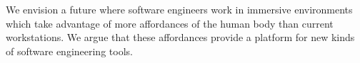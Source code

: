 \documentclass[conference]{IEEEtran}
\begin{document}
We envision a future where software engineers work in immersive environments which take advantage of more affordances of the human body than current workstations.
We argue that these affordances provide a platform for new kinds of software engineering tools. 







\end{document}
